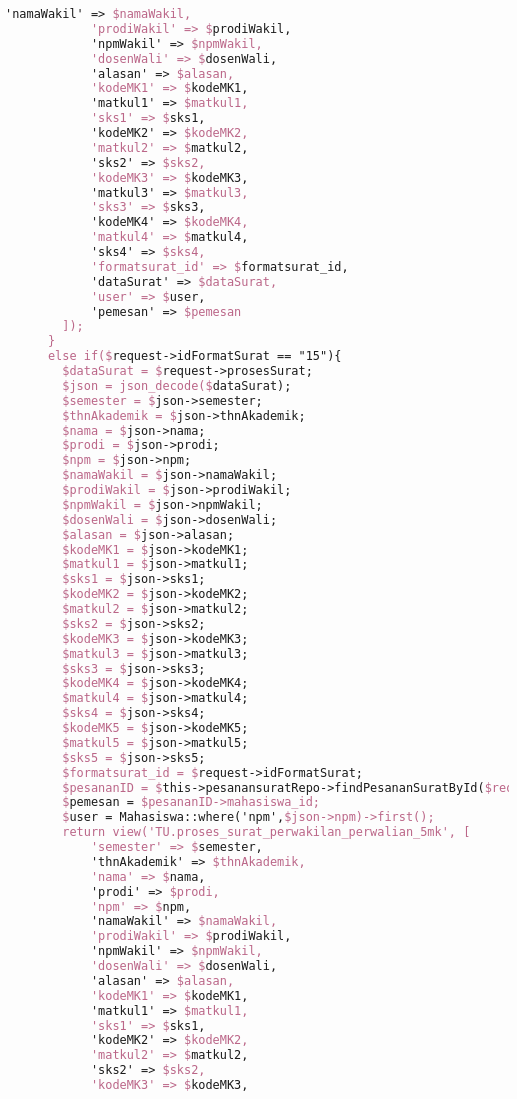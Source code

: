 \begin{lstlisting}[language=tex,basicstyle=\tiny,caption=PesanansuratController.php]
            'namaWakil' => $namaWakil,
            'prodiWakil' => $prodiWakil,
            'npmWakil' => $npmWakil,
            'dosenWali' => $dosenWali,
            'alasan' => $alasan,
            'kodeMK1' => $kodeMK1,
            'matkul1' => $matkul1,
            'sks1' => $sks1,
            'kodeMK2' => $kodeMK2,
            'matkul2' => $matkul2,
            'sks2' => $sks2,
            'kodeMK3' => $kodeMK3,
            'matkul3' => $matkul3,
            'sks3' => $sks3,
            'kodeMK4' => $kodeMK4,
            'matkul4' => $matkul4,
            'sks4' => $sks4,
            'formatsurat_id' => $formatsurat_id,
            'dataSurat' => $dataSurat,
            'user' => $user,
            'pemesan' => $pemesan
        ]);
      }
      else if($request->idFormatSurat == "15"){
        $dataSurat = $request->prosesSurat;
        $json = json_decode($dataSurat);
        $semester = $json->semester;
        $thnAkademik = $json->thnAkademik;
        $nama = $json->nama;
        $prodi = $json->prodi;
        $npm = $json->npm;
        $namaWakil = $json->namaWakil;
        $prodiWakil = $json->prodiWakil;
        $npmWakil = $json->npmWakil;
        $dosenWali = $json->dosenWali;
        $alasan = $json->alasan;
        $kodeMK1 = $json->kodeMK1;
        $matkul1 = $json->matkul1;
        $sks1 = $json->sks1;
        $kodeMK2 = $json->kodeMK2;
        $matkul2 = $json->matkul2;
        $sks2 = $json->sks2;
        $kodeMK3 = $json->kodeMK3;
        $matkul3 = $json->matkul3;
        $sks3 = $json->sks3;
        $kodeMK4 = $json->kodeMK4;
        $matkul4 = $json->matkul4;
        $sks4 = $json->sks4;
        $kodeMK5 = $json->kodeMK5;
        $matkul5 = $json->matkul5;
        $sks5 = $json->sks5;
        $formatsurat_id = $request->idFormatSurat;
        $pesananID = $this->pesanansuratRepo->findPesananSuratById($request->id);
        $pemesan = $pesananID->mahasiswa_id;
        $user = Mahasiswa::where('npm',$json->npm)->first();
        return view('TU.proses_surat_perwakilan_perwalian_5mk', [
            'semester' => $semester,
            'thnAkademik' => $thnAkademik,
            'nama' => $nama,
            'prodi' => $prodi,
            'npm' => $npm,
            'namaWakil' => $namaWakil,
            'prodiWakil' => $prodiWakil,
            'npmWakil' => $npmWakil,
            'dosenWali' => $dosenWali,
            'alasan' => $alasan,
            'kodeMK1' => $kodeMK1,
            'matkul1' => $matkul1,
            'sks1' => $sks1,
            'kodeMK2' => $kodeMK2,
            'matkul2' => $matkul2,
            'sks2' => $sks2,
            'kodeMK3' => $kodeMK3,

\end{lstlisting}
